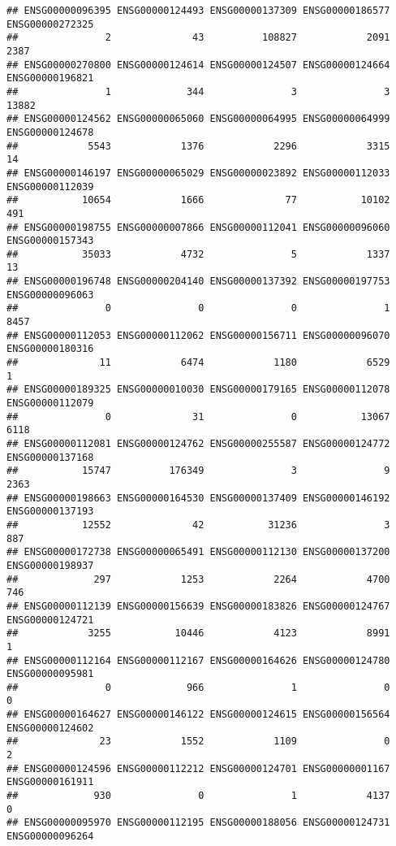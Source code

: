 \documentclass[
]{article}
\begin{document}
\begin{verbatim}
## ENSG00000096395 ENSG00000124493 ENSG00000137309 ENSG00000186577 ENSG00000272325 
##               2              43          108827            2091            2387 
## ENSG00000270800 ENSG00000124614 ENSG00000124507 ENSG00000124664 ENSG00000196821 
##               1             344               3               3           13882 
## ENSG00000124562 ENSG00000065060 ENSG00000064995 ENSG00000064999 ENSG00000124678 
##            5543            1376            2296            3315              14 
## ENSG00000146197 ENSG00000065029 ENSG00000023892 ENSG00000112033 ENSG00000112039 
##           10654            1666              77           10102             491 
## ENSG00000198755 ENSG00000007866 ENSG00000112041 ENSG00000096060 ENSG00000157343 
##           35033            4732               5            1337              13 
## ENSG00000196748 ENSG00000204140 ENSG00000137392 ENSG00000197753 ENSG00000096063 
##               0               0               0               1            8457 
## ENSG00000112053 ENSG00000112062 ENSG00000156711 ENSG00000096070 ENSG00000180316 
##              11            6474            1180            6529               1 
## ENSG00000189325 ENSG00000010030 ENSG00000179165 ENSG00000112078 ENSG00000112079 
##               0              31               0           13067            6118 
## ENSG00000112081 ENSG00000124762 ENSG00000255587 ENSG00000124772 ENSG00000137168 
##           15747          176349               3               9            2363 
## ENSG00000198663 ENSG00000164530 ENSG00000137409 ENSG00000146192 ENSG00000137193 
##           12552              42           31236               3             887 
## ENSG00000172738 ENSG00000065491 ENSG00000112130 ENSG00000137200 ENSG00000198937 
##             297            1253            2264            4700             746 
## ENSG00000112139 ENSG00000156639 ENSG00000183826 ENSG00000124767 ENSG00000124721 
##            3255           10446            4123            8991               1 
## ENSG00000112164 ENSG00000112167 ENSG00000164626 ENSG00000124780 ENSG00000095981 
##               0             966               1               0               0 
## ENSG00000164627 ENSG00000146122 ENSG00000124615 ENSG00000156564 ENSG00000124602 
##              23            1552            1109               0               2 
## ENSG00000124596 ENSG00000112212 ENSG00000124701 ENSG00000001167 ENSG00000161911 
##             930               0               1            4137               0 
## ENSG00000095970 ENSG00000112195 ENSG00000188056 ENSG00000124731 ENSG00000096264 

\end{verbatim}
\end{document}
